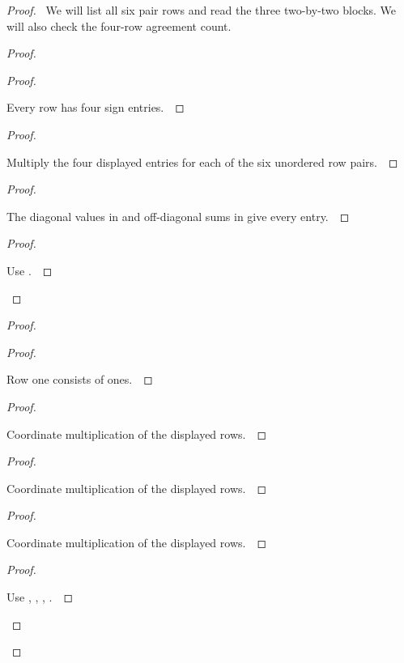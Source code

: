 \documentclass[11pt]{amsart}
\let\qed\relax
\theoremstyle{definition}
\begin{document}
\begin{proof}
\pfsketch\ We will list all six pair rows and read the three two-by-two blocks. We will also check the four-row agreement count.
\begin{proof}
\begin{proof}
\pf\ \raggedright Every row has four sign entries.~\qed
\end{proof}
\begin{proof}
\pf\ \raggedright Multiply the four displayed entries for each of the six unordered row pairs.~\qed
\end{proof}
\begin{proof}
\pf\ \raggedright The diagonal values in  and off-diagonal sums in  give every entry.~\qed
\end{proof}
\qedstep
\begin{proof}
\pf\ \raggedright Use .~\qed
\end{proof}
\end{proof}
\begin{proof}
\begin{proof}
\pf\ \raggedright Row one consists of ones.~\qed
\end{proof}
\begin{proof}
\pf\ \raggedright Coordinate multiplication of the displayed rows.~\qed
\end{proof}
\begin{proof}
\pf\ \raggedright Coordinate multiplication of the displayed rows.~\qed
\end{proof}
\begin{proof}
\pf\ \raggedright Coordinate multiplication of the displayed rows.~\qed
\end{proof}
\qedstep
\begin{proof}
\pf\ \raggedright Use , , , .~\qed

\end{proof}
\end{proof}
\end{proof}
\end{document}
